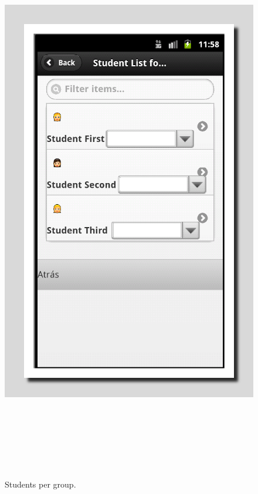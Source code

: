 \documentclass[a4paper]{article}
\begin{document}
\begin{enumerate}
\begin{enumerate}
\begin{figure}
\centering
\includegraphics[width=15.73cm,height=24.791cm]{PhoneGapProjectMSWLMemory-img/PhoneGapProjectMSWLMemory-img10.png}
\caption[Students per group.]{Students per group.}

\end{figure}
\clearpage


\end{enumerate}
\end{enumerate}
\end{document}
